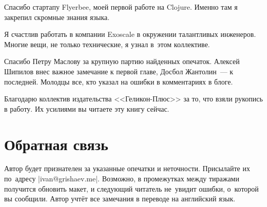 Спасибо стартапу Flyerbee, моей первой работе на Clojure. Именно там я закрепил
скромные знания языка.

Я счастлив работать в компании Exoscale в окружении талантливых
инженеров. Многие вещи, не только технические, я узнал в~этом коллективе.

Спасибо Петру Маслову за крупную партию найденных опечаток. Алексей Шипилов внес
важное замечание к первой главе, Досбол Жантолин~--- к последней. Молодцы все,
кто указал на ошибки в комментариях в блоге.

Благодарю коллектив издательства <<Геликон-Плюс>> за то, что взяли рукопись в
работу. Их усилиями вы читаете эту книгу сейчас.

\section*{Обратная связь}

Автор будет признателен за указанные опечатки и неточности. Присылайте их
по~адресу \spverb|ivan@grishaev.me|. Возможно, в промежутках между тиражами
получится обновить макет, и следующий читатель не~увидит ошибки, о~которой вы
сообщили. Автор учт\"{е}т все замечания в переводе на английский язык.
